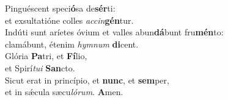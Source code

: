 \oddverse Pinguéscent speci\textbf{ó}sa de\textbf{sér}ti:~\*\\
\oddverse et exsultatióne colles \textit{ac}\textit{cin}\textbf{gén}tur.\\
\evenverse Indúti sunt aríetes óvium et valles abun\textbf{dá}bunt fru\textbf{mén}to:~\*\\
\evenverse clamábunt, étenim \textit{hym}\textit{num} \textbf{di}cent.\\
\oddverse Glória \textbf{Pa}tri, et \textbf{Fí}lio,~\*\\
\oddverse et Spirí\textit{tu}\textit{i} \textbf{San}cto.\\
\evenverse Sicut erat in princípio, et \textbf{nunc}, et \textbf{sem}per,~\*\\
\evenverse et in sǽcula sæcu\textit{ló}\textit{rum}. \textbf{A}men.\\
